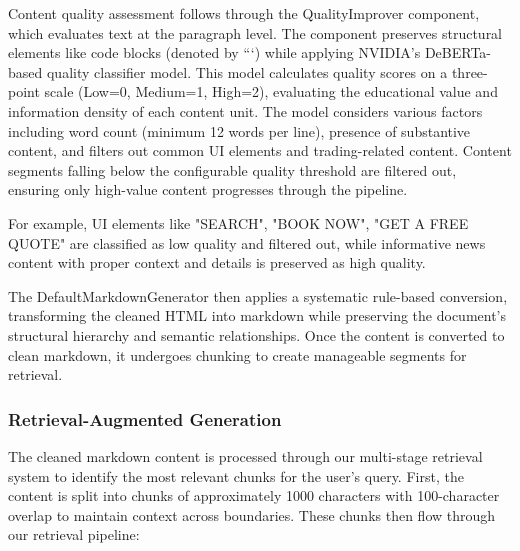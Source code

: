 \documentclass[fleqn,moreauthors,10pt]{ds_report}
\begin{document}
Content quality assessment follows through the QualityImprover component, which evaluates text at the paragraph level. The component preserves structural elements like code blocks (denoted by ```) while applying NVIDIA's DeBERTa-based quality classifier model. This model calculates quality scores on a three-point scale (Low=0, Medium=1, High=2), evaluating the educational value and information density of each content unit. The model considers various factors including word count (minimum 12 words per line), presence of substantive content, and filters out common UI elements and trading-related content. Content segments falling below the configurable quality threshold are filtered out, ensuring only high-value content progresses through the pipeline.

For example, UI elements like "SEARCH", "BOOK NOW", "GET A FREE QUOTE" are classified as low quality and filtered out, while informative news content with proper context and details is preserved as high quality.

The DefaultMarkdownGenerator then applies a systematic rule-based conversion, transforming the cleaned HTML into markdown while preserving the document's structural hierarchy and semantic relationships. Once the content is converted to clean markdown, it undergoes chunking to create manageable segments for retrieval.

\subsubsection*{Retrieval-Augmented Generation}
The cleaned markdown content is processed through our multi-stage retrieval system to identify the most relevant chunks for the user's query. First, the content is split into chunks of approximately 1000 characters with 100-character overlap to maintain context across boundaries. These chunks then flow through our retrieval pipeline:
\end{document}
